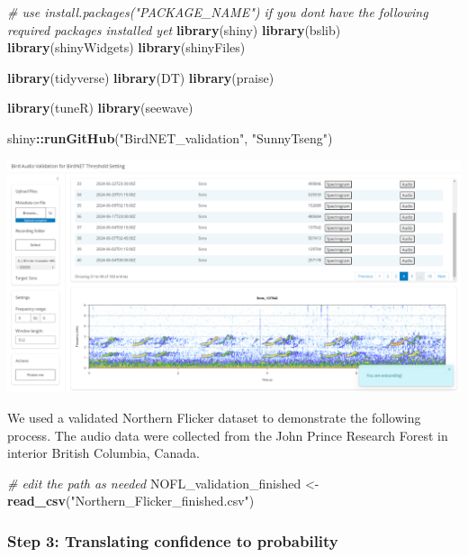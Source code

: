 \documentclass[
]{article}
\newenvironment{Shaded}{\begin{snugshade}}{\end{snugshade}}
\newcommand{\CommentTok}[1]{\textcolor[rgb]{0.56,0.35,0.01}{\textit{#1}}}
\newcommand{\FunctionTok}[1]{\textcolor[rgb]{0.13,0.29,0.53}{\textbf{#1}}}
\newcommand{\NormalTok}[1]{#1}
\newcommand{\OtherTok}[1]{\textcolor[rgb]{0.56,0.35,0.01}{#1}}
\newcommand{\SpecialCharTok}[1]{\textcolor[rgb]{0.81,0.36,0.00}{\textbf{#1}}}
\newcommand{\StringTok}[1]{\textcolor[rgb]{0.31,0.60,0.02}{#1}}
\begin{document}
\begin{Shaded}
\begin{Highlighting}[]
\CommentTok{\# use install.packages("PACKAGE\_NAME") if you don\textquotesingle{}t have the following required packages installed yet}
\FunctionTok{library}\NormalTok{(shiny) }
\FunctionTok{library}\NormalTok{(bslib)}
\FunctionTok{library}\NormalTok{(shinyWidgets) }
\FunctionTok{library}\NormalTok{(shinyFiles)}

\FunctionTok{library}\NormalTok{(tidyverse)}
\FunctionTok{library}\NormalTok{(DT)}
\FunctionTok{library}\NormalTok{(praise)}

\FunctionTok{library}\NormalTok{(tuneR)}
\FunctionTok{library}\NormalTok{(seewave)}

\NormalTok{shiny}\SpecialCharTok{::}\FunctionTok{runGitHub}\NormalTok{(}\StringTok{"BirdNET\_validation"}\NormalTok{, }\StringTok{"SunnyTseng"}\NormalTok{)}
\end{Highlighting}
\end{Shaded}

\includegraphics{images/clipboard-2461646757.png}

We used a validated Northern Flicker dataset to demonstrate the
following process. The audio data were collected from the John Prince
Research Forest in interior British Columbia, Canada.

\begin{Shaded}
\begin{Highlighting}[]
\CommentTok{\# edit the path as needed}
\NormalTok{NOFL\_validation\_finished }\OtherTok{\textless{}{-}} \FunctionTok{read\_csv}\NormalTok{(}\StringTok{"Northern\_Flicker\_finished.csv"}\NormalTok{)}
\end{Highlighting}
\end{Shaded}

\subsubsection{Step 3: Translating confidence to
probability}\label{step-3-translating-confidence-to-probability}
\end{document}
